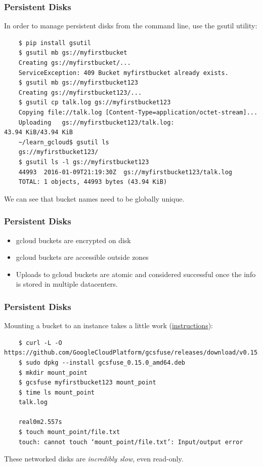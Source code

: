 \documentclass[9pt]{beamer}
\begin{document}
\begin{frame}[fragile]
  \frametitle{Persistent Disks}
  In order to manage persistent disks from the command line, use the gsutil utility:
  \begin{verbatim}
    $ pip install gsutil
    $ gsutil mb gs://myfirstbucket
    Creating gs://myfirstbucket/...
    ServiceException: 409 Bucket myfirstbucket already exists.
    $ gsutil mb gs://myfirstbucket123
    Creating gs://myfirstbucket123/...
    $ gsutil cp talk.log gs://myfirstbucket123
    Copying file://talk.log [Content-Type=application/octet-stream]...
    Uploading   gs://myfirstbucket123/talk.log:                      43.94 KiB/43.94 KiB
    ~/learn_gcloud$ gsutil ls
    gs://myfirstbucket123/
    $ gsutil ls -l gs://myfirstbucket123
    44993  2016-01-09T21:19:30Z  gs://myfirstbucket123/talk.log
    TOTAL: 1 objects, 44993 bytes (43.94 KiB)
  \end{verbatim}
  We can see that bucket names need to be globally unique.
\end{frame}

\begin{frame}[fragile]
  \frametitle{Persistent Disks}
  \begin{itemize}
  \item gcloud buckets are encrypted on disk
  \item gcloud buckets are accessible outside zones
  \item Uploads to gcloud buckets are atomic and considered successful once the info is stored in multiple datacenters.
  \end{itemize}
\end{frame}

\begin{frame}[fragile]
  \frametitle{Persistent Disks}
  Mounting a bucket to an instance takes a little work (\href{https://github.com/googlecloudplatform/gcsfuse/blob/master/docs/installing.md}{instructions}):
  \begin{verbatim}
    $ curl -L -O https://github.com/GoogleCloudPlatform/gcsfuse/releases/download/v0.15.0/gcsfuse_0.15.0_amd64.deb
    $ sudo dpkg --install gcsfuse_0.15.0_amd64.deb
    $ mkdir mount_point
    $ gcsfuse myfirstbucket123 mount_point
    $ time ls mount_point
    talk.log

    real0m2.557s
    $ touch mount_point/file.txt
    touch: cannot touch ‘mount_point/file.txt’: Input/output error
  \end{verbatim}
  These networked disks are \emph{incredibly slow}, even read-only.
\end{frame}
\end{document}
